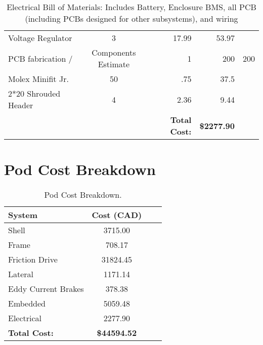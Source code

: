 \documentclass[main.tex]{subfiles}
\begin{document}
\begin{table}[H]
\begin{tabular}{@{}lcrr@{}}
        Voltage Regulator& 3 & 17.99 & 53.97 \\
        PCB fabrication /& Components Estimate& 1 & 200 & 200 \\
        Molex Minifit Jr. & 50 & .75 & 37.5 \\
        2*20 Shrouded Header& 4 & 2.36 & 9.44 \\
        \midrule
        &  &  \textbf{Total Cost:} & \textbf{\$2277.90} \\ \bottomrule
      \end{tabular}
      \caption{Electrical Bill of Materials: Includes Battery, Enclosure BMS, all PCB (including PCBs designed for other subsystems), and wiring}
      \label{tab:emb-bom}
\end{table}

\section{Pod Cost Breakdown}
\begin{table}[H]
  	  \centering
      \begin{tabular}{@{}lcrr@{}} \toprule
        System & Cost (CAD) \\ \midrule
        Shell & 3715.00 \\
        Frame & 708.17 \\
        Friction Drive & 31824.45 \\
        Lateral & 1171.14 \\
        Eddy Current Brakes & 378.38 \\
        Embedded & 5059.48 \\
        Electrical & 2277.90 \\ \midrule
        \textbf{Total Cost:} & \textbf{\$44594.52} \\ \bottomrule
      \end{tabular}
      \caption{Pod Cost Breakdown.}
      \label{tab:emb-bom}
\end{table}
\end{document}
